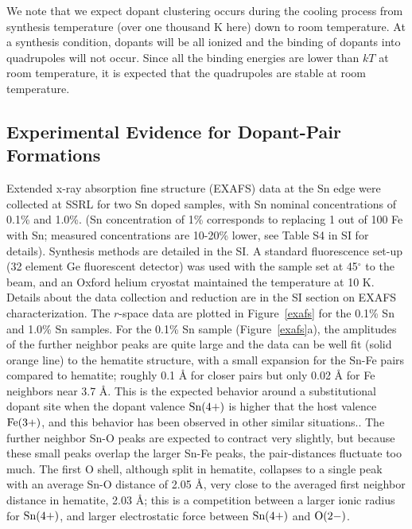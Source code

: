 We note that we expect dopant clustering occurs during the cooling process from synthesis temperature (over one thousand K here) down to room temperature. At a synthesis condition, dopants will be all ionized and the binding of dopants into quadrupoles will not occur.
Since all the binding energies are lower than $kT$ at room temperature, it is expected that the quadrupoles are stable at room temperature.


\subsection{Experimental Evidence for Dopant-Pair Formations}

Extended x-ray absorption fine structure (EXAFS) data at the Sn edge were collected at SSRL for two Sn doped  samples, with Sn nominal concentrations of 0.1\% and 1.0\%. (Sn concentration of 1\% corresponds to replacing 1 out of 100 Fe with Sn; measured concentrations are 10-20\% lower, see Table S4 in SI for details). Synthesis methods are detailed in the SI. A standard fluorescence set-up (32 element Ge fluorescent detector) was used with the sample set at 45$^{\circ}$ to the beam, and an Oxford helium cryostat maintained the temperature at 10 K. Details about the data collection and reduction are in the SI section on EXAFS characterization. The $r$-space data are plotted in Figure~\ref{exafs} for the 0.1\% Sn and 1.0\% Sn samples. For the 0.1\% Sn sample (Figure~\ref{exafs}a), the amplitudes of the further neighbor peaks are quite large and the data can be well fit (solid orange line) to the hematite structure, with a small expansion for the Sn-Fe pairs compared to hematite;  roughly 0.1 {\AA} for closer pairs but only 0.02 {\AA} for Fe neighbors near 3.7 {\AA}. This is the expected behavior around a substitutional dopant site when the dopant valence $\rm Sn(4+)$ is higher that the host valence $\rm Fe(3+)$, and this behavior has been observed in other similar situations.\cite{mackeen2018substitution}. The further neighbor Sn-O peaks are expected to contract very slightly, but because these small peaks overlap the larger Sn-Fe peaks, the pair-distances fluctuate too much. The first O shell, although split in hematite, collapses to a single peak with an average Sn-O distance of 2.05 {\AA}, very close to the averaged first neighbor distance in hematite, 2.03 {\AA}; this is a competition between a larger ionic radius for $\rm Sn(4+)$, and larger electrostatic force between $\rm Sn(4+)$ and $\rm O(2-)$.

